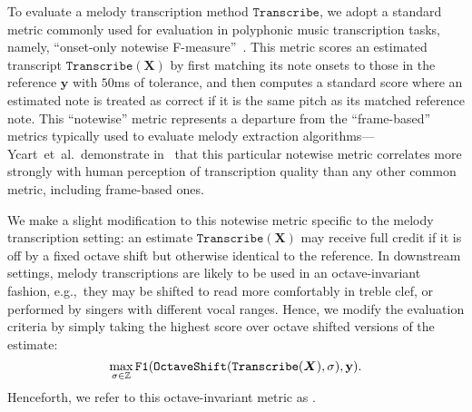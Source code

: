 
To evaluate a melody transcription method $\texttt{Transcribe}$, 
we adopt a standard metric commonly used for evaluation in polyphonic music transcription tasks, namely,  ``onset-only notewise F-measure''~\cite{ycart2020investigating}. 
This metric scores an estimated transcript $\texttt{Transcribe}(\bm{X})$ by first matching its note onsets to those in the reference $\bm{y}$ with $50$ms of tolerance, and then computes a standard \fone{} score where an estimated note is treated as correct if it is the same pitch as its matched reference note. 
This ``notewise'' metric represents a departure from the ``frame-based'' metrics typically used to evaluate melody extraction algorithms---Ycart~et~al.\ demonstrate in~\cite{ycart2020investigating} that this particular notewise metric correlates more strongly with human perception of transcription quality than any other common metric, including frame-based ones.

We make a slight modification to this notewise metric 
specific to 
the melody transcription setting: an estimate $\texttt{Transcribe}(\bm{X})$ may receive full credit if it is off by a fixed octave shift but otherwise identical to the reference. 
In downstream settings, melody transcriptions are likely to be used in an octave-invariant fashion, e.g.,~they may be shifted to read more comfortably in treble clef, or performed by singers with different vocal ranges. 
Hence, we modify the evaluation criteria by simply taking the highest score over octave shifted versions of the estimate:
\begin{equation*}
    \max_{\sigma \in \mathbb{Z}} \texttt{\texttt{F1}}(\texttt{OctaveShift}(\texttt{Transcribe}(\mbox{\boldmath{$X$}}), \sigma), \mathbf{y}).
\end{equation*}
Henceforth, we refer to this octave-invariant metric as \fone. 